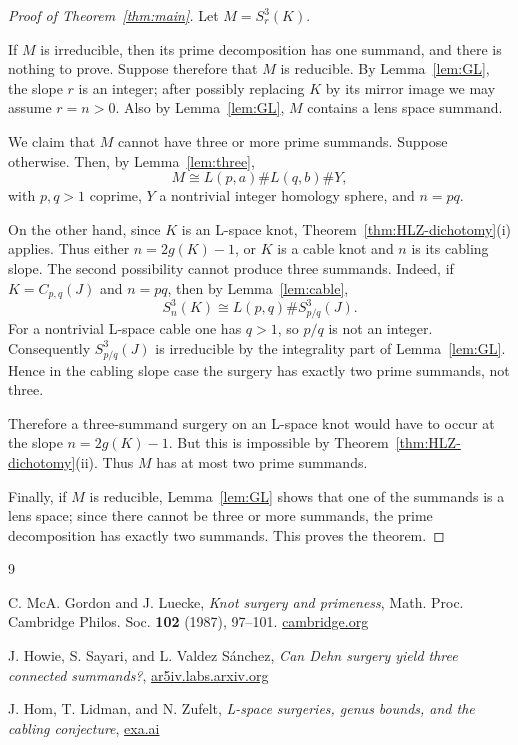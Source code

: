 \documentclass[12pt]{article}
\theoremstyle{definition}
\begin{document}
\begin{proof}[Proof of Theorem~\ref{thm:main}]
Let \(M=S^3_r(K)\).

If \(M\) is irreducible, then its prime decomposition has one summand, and there
is nothing to prove.  Suppose therefore that \(M\) is reducible.  By
Lemma~\ref{lem:GL}, the slope \(r\) is an integer; after possibly replacing
\(K\) by its mirror image we may assume \(r=n>0\).  Also by
Lemma~\ref{lem:GL}, \(M\) contains a lens space summand.

We claim that \(M\) cannot have three or more prime summands.  Suppose otherwise.
Then, by Lemma~\ref{lem:three},
\[
M\cong L(p,a)\#L(q,b)\#Y,
\]
with \(p,q>1\) coprime, \(Y\) a nontrivial integer homology sphere, and
\(n=pq\).

On the other hand, since \(K\) is an L-space knot,
Theorem~\ref{thm:HLZ-dichotomy}(i) applies.  Thus either
\(n=2g(K)-1\), or \(K\) is a cable knot and \(n\) is its cabling slope.
The second possibility cannot produce three summands.  Indeed, if
\(K=C_{p,q}(J)\) and \(n=pq\), then by Lemma~\ref{lem:cable},
\[
S^3_n(K)\cong L(p,q)\#S^3_{p/q}(J).
\]
For a nontrivial L-space cable one has \(q>1\), so \(p/q\) is not an integer.
Consequently \(S^3_{p/q}(J)\) is irreducible by the integrality part of
Lemma~\ref{lem:GL}.  Hence in the cabling slope case the surgery has exactly two
prime summands, not three.

Therefore a three-summand surgery on an L-space knot would have to occur at the
slope \(n=2g(K)-1\).  But this is impossible by
Theorem~\ref{thm:HLZ-dichotomy}(ii).  Thus \(M\) has at most two prime
summands.

Finally, if \(M\) is reducible, Lemma~\ref{lem:GL} shows that one of the
summands is a lens space; since there cannot be three or more summands, the
prime decomposition has exactly two summands.  This proves the theorem.
\end{proof}

\begin{thebibliography}{9}

C. McA. Gordon and J. Luecke,
\emph{Knot surgery and primeness},
Math. Proc. Cambridge Philos. Soc. \textbf{102} (1987), 97--101.
\newline
\href{https://www.cambridge.org/core/journals/mathematical-proceedings-of-the-cambridge-philosophical-society/article/abs/knot-surgery-and-primeness/29D04C8E36EF794942FA2F0925BE1775}{cambridge.org}

J. Howie, S. Sayari, and L. Valdez S\'anchez,
\emph{Can Dehn surgery yield three connected summands?},
\newline
\href{https://ar5iv.labs.arxiv.org/html/0908.2697}{ar5iv.labs.arxiv.org}

J. Hom, T. Lidman, and N. Zufelt,
\emph{L-space surgeries, genus bounds, and the cabling conjecture},
\newline
\href{https://exa.ai/library/publication/zl1m8jt741b}{exa.ai}

\end{thebibliography}
\end{document}
